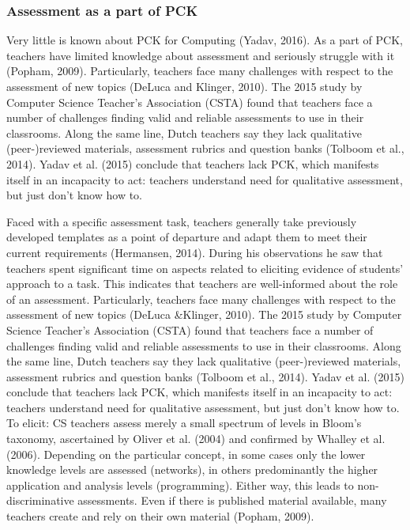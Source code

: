 \subsubsection*{Assessment as a part of PCK}
Very little is known about PCK for Computing (Yadav, 2016). As a part of PCK, teachers have limited knowledge about assessment and seriously struggle with it (Popham, 2009). Particularly, teachers face many challenges with respect to the assessment of new topics (DeLuca and Klinger, 2010). The 2015 study by Computer Science Teacher's Association (CSTA) found that teachers face a number of challenges finding valid and reliable assessments to use in their classrooms. Along the same line, Dutch teachers say they lack qualitative (peer-)reviewed materials, assessment rubrics and question banks (Tolboom et al., 2014). Yadav et al. (2015) conclude that teachers lack PCK, which manifests itself in an incapacity to act: teachers understand need for qualitative assessment, but just don't know how to.


Faced with a specific assessment task, teachers generally take previously developed templates as a point of departure and adapt them to meet their current requirements (Hermansen, 2014). During his observations he saw that teachers spent significant time on aspects related to eliciting evidence of students' approach to a task. This indicates that teachers are well-informed about the role of an assessment.
Particularly, teachers face many challenges with respect to the assessment of new topics (DeLuca \&Klinger, 2010). The 2015 study by Computer Science Teacher's Association (CSTA) found that teachers face a number of challenges finding valid and reliable assessments to use in their classrooms. Along the same line, Dutch teachers say they lack qualitative (peer-)reviewed materials, assessment rubrics and question banks (Tolboom et al., 2014). Yadav et al. (2015) conclude that teachers lack PCK, which manifests itself in an incapacity to act: teachers understand need for qualitative assessment, but just don't know how to. To elicit: CS teachers assess merely a small spectrum of levels in Bloom's taxonomy, ascertained by Oliver et al. (2004) and confirmed by Whalley et al. (2006). Depending on the particular concept, in some cases only the lower knowledge levels are assessed (networks), in others predominantly the higher application and analysis levels (programming). Either way, this leads to non-discriminative assessments. Even if there is published material available, many teachers create and rely on their own material (Popham, 2009).

